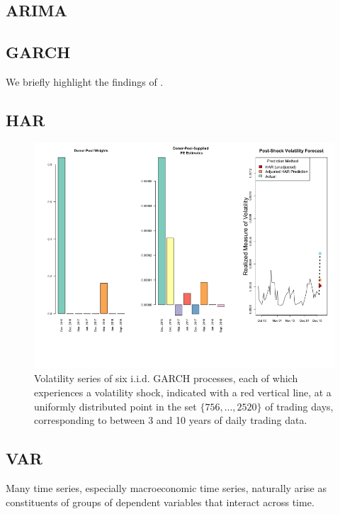 \documentclass[11pt]{article}
\theoremstyle{definition}
\begin{document}
 


\subsection{ARIMA}
\cite{lin2021minimizing}
\subsection{GARCH}
We briefly highlight the findings of \citep{lundquist2024volatility}.
\subsection{HAR}
\begin{figure}[h!]
  \begin{center}
    \includegraphics[scale=.4]{real_data_output_plots/savetime_SatJun151644072024__^VIX-^IRX-^XAU_^VIX_2018-12-18-2015-12-15-2016-12-13-2017-03-14-2017-06-13-2017-12-12-2018-03-20-2018-06-12-2018-09-25.png}
    \caption{Volatility series of six i.i.d. GARCH processes, each of which experiences a volatility shock, indicated with a red vertical line, at a uniformly distributed point in the set $\{756,...,2520\}$ of trading days, corresponding to between 3 and 10 years of daily trading data.}
    \label{fig:six_plots}
    \end{center}
  \end{figure}

\subsection{VAR}
Many time series, especially macroeconomic time series, naturally arise as constituents of groups of dependent variables that interact across time.
\end{document}
